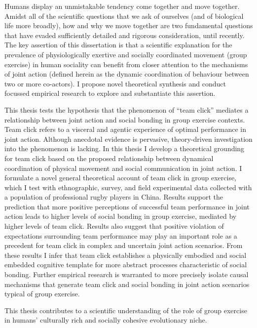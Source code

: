 Humans display an unmistakable tendency come together and move together.  Amidst all of the scientific questions that we ask of ourselves (and of biological life more broadly), how and why we move together are two fundamental questions that have evaded sufficiently detailed and rigorous consideration, until recently.  The key assertion of this dissertation is that a scientific explanation for the prevalence of physiologically exertive and socially coordinated movement (group exercise) in human sociality can benefit from closer attention to the mechanisms of joint action (defined herein as the dynamic coordination of behaviour between two or more co-actors).  I propose novel theoretical synthesis and conduct focussed empirical research to explore and substantiate this assertion.

This thesis tests the hypothesis that the phenomenon of ``team click'' mediates a relationship between joint action and social bonding in group exercise contexts.  Team click refers to a visceral and agentic experience of optimal performance in joint action.  Although anecdotal evidence is pervasive, theory-driven investigation into the phenomenon is lacking.  In this thesis I develop a theoretical grounding for team click based on the proposed relationship between dynamical coordination of physical movement and social communication in joint action.  I formulate a novel general theoretical account of team click in group exercise, which I test with ethnographic, survey, and field experimental data collected with a population of professional rugby players in China.  Results support the prediction that more positive perceptions of successful team performance in joint action leads to higher levels of social bonding in group exercise, mediated by higher levels of team click.  Results also suggest that positive violation of expectations surrounding team performance may play an important role as a precedent for team click in complex and uncertain joint action scenarios.  From these results I infer that team click establishes a physically embodied and social embedded cognitive template for more abstract processes characteristic of social bonding.  Further empirical research is warranted to more precisely isolate causal mechanisms that generate team click and social bonding in joint action scenarios typical of group exercise.

This thesis contributes to a scientific understanding of the role of group exercise in humans' culturally rich and socially cohesive evolutionary niche. 



